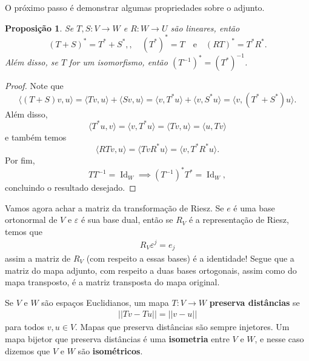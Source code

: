 \documentclass{article}
\newtheorem{proposition}[definition]{Proposição}
\DeclareMathOperator{\Id}{Id}
\begin{document}
O próximo passo é demonstrar algumas propriedades sobre o adjunto.

\begin{proposition}
    Se $T, S \colon V \to W$ e $R \colon W \to U$ são lineares, então \begin{equation}
        (T + S)^* = T^* + S^*,, \quad (T^*)^* = T \quad \text{e} \quad (RT)^* = T^* R^*.
    \end{equation} Além disso, se $T$ for um isomorfismo, então $(T^{-1})^* = (T^*)^{-1}$.
\end{proposition}
\begin{proof}
    Note que \begin{equation}
        \langle (T+S)v, u \rangle = \langle Tv, u \rangle + \langle Sv, u \rangle = \langle v, T^*u \rangle + \langle v, S^*u \rangle = \langle v, (T^* + S^*)u \rangle.
    \end{equation} Além disso, \begin{equation}
        \langle T^*u, v \rangle = \langle v, T^*u \rangle = \langle Tv, u \rangle = \langle u, Tv \rangle
    \end{equation} e também temos \begin{equation}
        \langle RTv, u \rangle = \langle Tv R^*u \rangle = \langle v, T^*R^*u \rangle.
    \end{equation} Por fim, \begin{equation}
        TT^{-1} = \Id_W \implies (T^{-1})^*T^* = \Id_W,
    \end{equation} concluindo o resultado desejado.
\end{proof}

Vamos agora achar a matriz da transformação de Riesz. Se $e$ é uma base ortonormal de $V$ e $\varepsilon$ é sua base dual, então se $R_V$ é a representação de Riesz, temos que \begin{eqnarray}
    R_V\varepsilon^j =  e_j
\end{eqnarray} assim a matriz de $R_V$ (com respeito a essas bases) é a identidade! Segue que a matriz do mapa adjunto, com respeito a duas bases ortogonais, assim como do mapa transposto, é a matriz transposta do mapa original.

Se $V$ e $W$ são espaços Euclidianos, um mapa $T \colon V \to W$ \textbf{preserva distâncias} se \begin{eqnarray}
    ||Tv - Tu|| = ||v - u||
\end{eqnarray} para todos $v, u \in V$. Mapas que preserva distâncias são sempre injetores. Um mapa bijetor que preserva distâncias é uma \textbf{isometria} entre $V$ e $W$, e nesse caso dizemos que $V$ e $W$ são \textbf{isométricos}.
\end{document}

